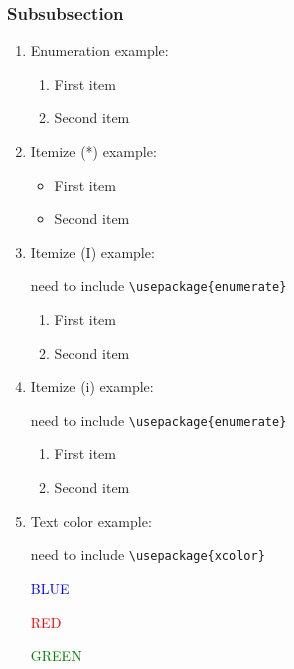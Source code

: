 \documentclass[12pt,a4paper]{article}
\begin{document}
\subsubsection{Subsubsection}
\begin{enumerate}
    \item Enumeration example:
    
        \begin{enumerate}
            \item First item
            \item Second item
        \end{enumerate}
\item Itemize (*) example:

        \begin{itemize}
            \item First item
            \item Second item
        \end{itemize}
\item Itemize (I) example:
        
        need to include \verb|\usepackage{enumerate}| 
        \begin{enumerate}[I]
            \item First item
            \item Second item
        \end{enumerate}
\item Itemize (i) example:
        
        need to include \verb|\usepackage{enumerate}| 
        \begin{enumerate}[i]
            \item First item
            \item Second item
        \end{enumerate}
\item Text color example:

      need to include \verb|\usepackage{xcolor}| 

\textcolor{blue}{BLUE}

\textcolor{red}{RED}

\textcolor{green}{GREEN}



\end{enumerate}
\end{document}
